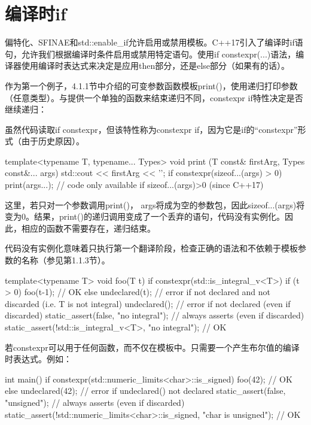 \section{编译时if}
偏特化、SFINAE和std::enable\_if允许启用或禁用模板。C++17引入了编译时if语句，允许我们根据编译时条件启用或禁用特定语句。使用if constexpr(...)语法，编译器使用编译时表达式来决定是应用then部分，还是else部分（如果有的话）。

作为第一个例子，4.1.1节中介绍的可变参数函数模板print()，使用递归打印参数（任意类型）。与提供一个单独的函数来结束递归不同，constexpr if特性决定是否继续递归：

\begin{notice}
虽然代码读取if constexpr，但该特性称为constexpr if，因为它是if的“constexpr”形式（由于历史原因）。
\end{notice}

\begin{cpp}
template<typename T, typename... Types>
void print (T const& firstArg, Types const&... args) {
	std::cout << firstArg << '\n';
	if constexpr(sizeof...(args) > 0) {
		print(args...); // code only available if sizeof...(args)>0 (since C++17)
	}
}
\end{cpp}

这里，若只对一个参数调用print()， args将成为空的参数包，因此sizeof...(args)将变为0。结果，print()的递归调用变成了一个丢弃的语句，代码没有实例化。因此，相应的函数不需要存在，递归结束。

代码没有实例化意味着只执行第一个翻译阶段，检查正确的语法和不依赖于模板参数的名称（参见第1.1.3节）。

\begin{cpp}
template<typename T>
void foo(T t) {
	if constexpr(std::is_integral_v<T>) {
		if (t > 0) {
			foo(t-1); // OK
		}
	}
	else {
		undeclared(t); // error if not declared and not discarded (i.e. T is not integral)
		undeclared(); // error if not declared (even if discarded)
		static_assert(false, "no integral"); // always asserts (even if discarded)
		static_assert(!std::is_integral_v<T>, "no integral"); // OK
	}
}
\end{cpp}

若constexpr可以用于任何函数，而不仅在模板中。只需要一个产生布尔值的编译时表达式。例如：

\begin{cpp}
int main() {
	if constexpr(std::numeric_limits<char>::is_signed) {
		foo(42); // OK
	}
	else {
		undeclared(42); // error if undeclared() not declared
		static_assert(false, "unsigned"); // always asserts (even if discarded)
		static_assert(!std::numeric_limits<char>::is_signed,
		"char is unsigned"); // OK
	}
}
\end{cpp}

